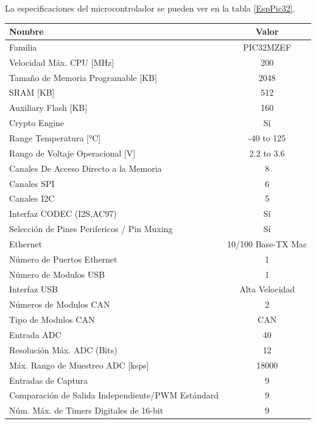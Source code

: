 \documentclass[letterpaper,12pt,oneside]{book}
\begin{document}
		La especificaciones del microcontrolador se pueden ver en la tabla \ref{EspPic32}.

		\newpage

		\begin{table}[!ht]
				\centering
				\begin{tabular}{ l | c }
					\textbf{Nombre} & \textbf{Valor} \\
					\hline
					Familia & PIC32MZEF \\
					\hline
					Velocidad Máx. CPU [MHz] & 200 \\
					\hline
					Tamaño de Memoria Programable [KB] & 2048 \\
					\hline
					SRAM [KB] & 512\\
					\hline
					Auxiliary Flash [KB] & 160 \\
					\hline
					Crypto Engine & Sí \\
					\hline
					Range Temperatura [°C] & -40 to 125 \\
					\hline
					Rango de Voltaje Operacional [V] & 2.2 to 3.6 \\
					\hline
					Canales De Acceso Directo a la Memoria & 8 \\
					\hline
					Canales SPI & 6 \\
					\hline
					Canales I2C & 5 \\
					\hline
					Interfaz CODEC (I2S,AC97) & Sí \\
					\hline
					Selección de Pines Perifericos / Pin Muxing & Sí \\
					\hline
					Ethernet & 10/100 Base-TX Mac \\
					\hline
					Número de Puertos Ethernet  & 1 \\
					\hline
					Número de Modulos USB & 1 \\
					\hline
					Interfaz USB & Alta Velocidad \\
					\hline
					Números de Modulos CAN & 2 \\
					\hline
					Tipo de Modulos CAN & CAN \\
					\hline
					Entrada ADC & 40 \\
					\hline
					Resolución Máx. ADC (Bits) & 12 \\
					\hline
					Máx. Rango de Muestreo ADC [ksps] & 18000 \\
					\hline
					Entradas de Captura & 9 \\
					\hline
					Comparación de Salida Independiente/PWM Estándard & 9 \\
					\hline
					Núm. Máx. de Timers Digitales de 16-bit & 9 \\

\end{tabular}
\end{table}
\end{document}
